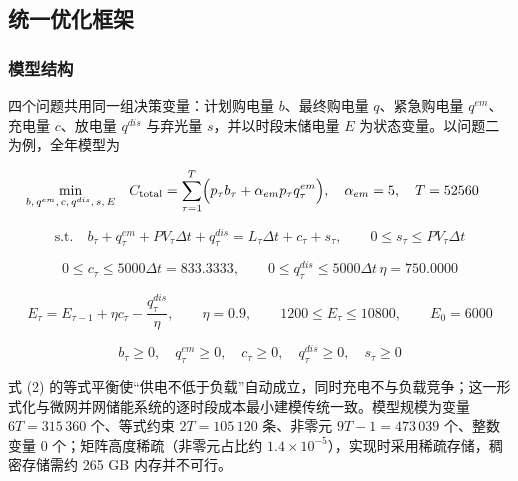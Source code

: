 \subsection{统一优化框架}

\subsubsection{模型结构}

四个问题共用同一组决策变量：计划购电量 $b$、最终购电量 $q$、紧急购电量 $q^{em}$、充电量 $c$、放电量 $q^{dis}$ 与弃光量 $s$，并以时段末储电量 $E$ 为状态变量。以问题二为例，全年模型为

\begin{equation}
\begin{aligned}
\min_{b,\,q^{em},\,c,\,q^{dis},\,s,\,E}\quad
& C_{\text{total}}=\sum_{\tau=1}^{T}\Bigl(p_{\tau}b_{\tau}+\alpha_{em}p_{\tau}q^{em}_{\tau}\Bigr),
\quad \alpha_{em}=5,\quad T=52560
\end{aligned}
\end{equation}

\begin{equation}
\text{s.t.}\quad
b_{\tau}+q^{em}_{\tau}+PV_{\tau}\Delta t+q^{dis}_{\tau}=L_{\tau}\Delta t+c_{\tau}+s_{\tau},
\qquad 0\le s_{\tau}\le PV_{\tau}\Delta t
\end{equation}

\begin{equation}
0\le c_{\tau}\le 5000\Delta t=833.3333,\qquad
0\le q^{dis}_{\tau}\le 5000\Delta t\,\eta=750.0000
\end{equation}

\begin{equation}
E_{\tau}=E_{\tau-1}+\eta c_{\tau}-\frac{q^{dis}_{\tau}}{\eta},\qquad
\eta=0.9,\qquad 1200\le E_{\tau}\le 10800,\qquad E_{0}=6000
\end{equation}

\begin{equation}
b_{\tau}\ge0,\quad q^{em}_{\tau}\ge0,\quad c_{\tau}\ge0,\quad q^{dis}_{\tau}\ge0,\quad s_{\tau}\ge0
\end{equation}

式 (2) 的等式平衡使“供电不低于负载”自动成立，同时充电不与负载竞争；这一形式化与微网并网储能系统的逐时段成本最小建模传统一致\cite{ref-csee-2023-mg-ems-review,ref-moradi-2018-standalone,ref-alguhi-2025-bess-operation,ref-valibeygi-2020-battery-dispatch-soc}。模型规模为变量 $6T=315\,360$ 个、等式约束 $2T=105\,120$ 条、非零元 $9T-1=473\,039$ 个、整数变量 0 个；矩阵高度稀疏（非零元占比约 $1.4\times10^{-5}$），实现时采用稀疏存储，稠密存储需约 265 GB 内存并不可行。

